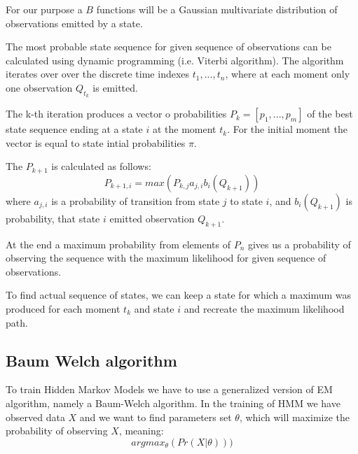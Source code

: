 \documentclass[12pt,a4paper,english]{article}
\begin{document}
For our purpose a $B$ functions will be a Gaussian multivariate distribution of observations emitted by a state. \newline

The most probable state sequence for given sequence of observations can be calculated using dynamic programming (i.e. Viterbi algorithm). \newline
The algorithm iterates over over the discrete time indexes $t_1, ..., t_n$, where at each moment only one observation $Q_{t_k}$ is emitted. \newline

The k-th iteration produces a vector o probabilities $P_k=[p_1, ..., p_m]$ of the best state sequence ending at a state $i$ at the moment $t_k$.
For the initial moment the vector is equal to state intial probabilities $\pi$. \newline

The $P_{k+1}$ is calculated as follows:
\begin{equation}
    P_{k+1, i} = max(P_{k, j} a_{j, i} b_i(Q_{k+1}))
\end{equation}
where $a_{j, i}$ is a probability of transition from state $j$ to state $i$, \newline
and $b_i(Q_{k+1})$ is probability, that state $i$ emitted observation $Q_{k+1}$. \newline

At the end a maximum probability from elements of $P_n$ gives us a probability of observing the sequence with the maximum likelihood for given sequence of observations. \newline

To find actual sequence of states, we can keep a state for which a maximum was produced for each moment $t_k$ and state $i$ and recreate the maximum likelihood path.

\newpage
\subsection{Baum Welch algorithm}

To train Hidden Markov Models we have to use a generalized version of EM algorithm, namely a Baum-Welch algorithm. \newline
In the training of HMM we have observed data $X$ and we want to find parameters set $\theta$, which will maximize the probability of observing $X$, meaning:
\begin{equation}
    argmax_\theta(Pr(X | \theta)))
\end{equation}
\end{document}
